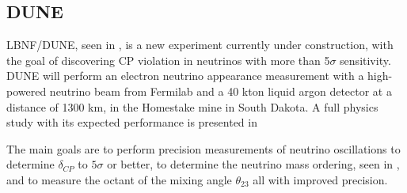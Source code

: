 \subsection{DUNE}
LBNF/DUNE\cite{23DUNE}, seen in , is a new experiment currently under construction, with the goal of discovering CP violation in neutrinos with more than 5$\sigma$ sensitivity. DUNE will perform an electron neutrino appearance measurement with a high-powered neutrino beam from Fermilab and a 40 kton liquid argon detector at a distance of 1300 km, in the Homestake mine in South Dakota. A full physics study with its expected performance is presented in~\cite{76Dune}

The main goals are to perform precision measurements of neutrino oscillations to determine $\delta_{CP}$ to $5\sigma$ or better, to determine the neutrino mass ordering, seen in , and to measure the octant of the mixing angle $\theta_{23}$ all with improved precision.

